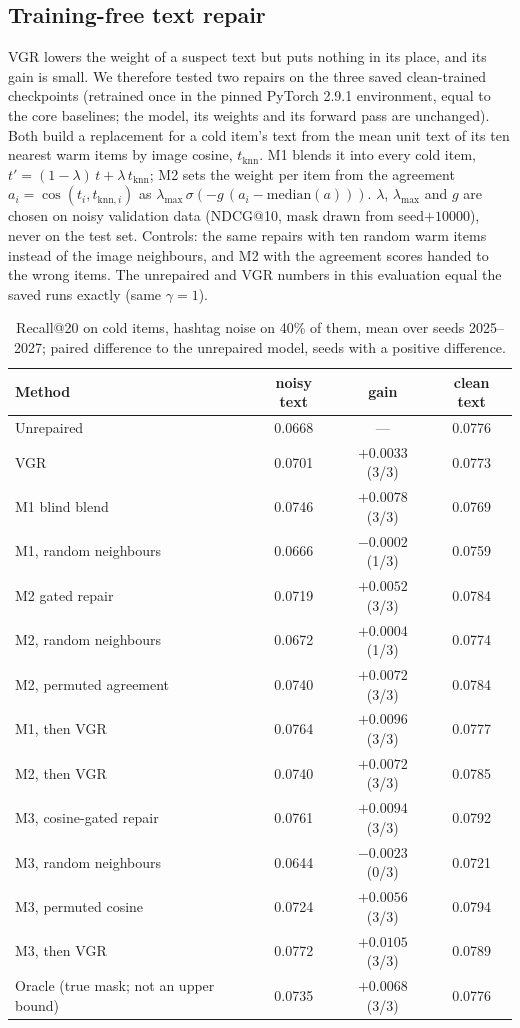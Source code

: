\documentclass[conference]{IEEEtran}
\begin{document}
\subsection{Training-free text repair}
\label{sec:repair}
VGR lowers the weight of a suspect text but puts nothing in its place, and its gain is small. We therefore tested two repairs on the three saved clean-trained checkpoints (retrained once in the pinned PyTorch 2.9.1 environment, equal to the core baselines; the model, its weights and its forward pass are unchanged). Both build a replacement for a cold item's text from the mean unit text of its ten nearest warm items by image cosine, $t_{\mathrm{knn}}$. M1 blends it into every cold item, $t' = (1-\lambda)\,t + \lambda\, t_{\mathrm{knn}}$; M2 sets the weight per item from the agreement $a_i = \cos(t_i, t_{\mathrm{knn},i})$ as $\lambda_{\max}\,\sigma(-g\,(a_i - \mathrm{median}(a)))$. $\lambda$, $\lambda_{\max}$ and $g$ are chosen on noisy validation data (NDCG@10, mask drawn from seed$+10000$), never on the test set. Controls: the same repairs with ten random warm items instead of the image neighbours, and M2 with the agreement scores handed to the wrong items. The unrepaired and VGR numbers in this evaluation equal the saved runs exactly (same $\gamma = 1$).

\begin{table}[t]
\centering\caption{Recall@20 on cold items, hashtag noise on 40\% of them, mean over seeds 2025--2027; paired difference to the unrepaired model, seeds with a positive difference.}
\label{tab:repair}
\small\setlength{\tabcolsep}{3pt}
\begin{tabular}{@{}>{\raggedright\arraybackslash}p{3.3cm}ccc@{}}
\hline
Method & noisy text & gain & clean text \\
\hline
Unrepaired & 0.0668 & --- & 0.0776 \\
VGR & 0.0701 & $+0.0033$ (3/3) & 0.0773 \\
M1 blind blend & 0.0746 & $+0.0078$ (3/3) & 0.0769 \\
M1, random neighbours & 0.0666 & $-0.0002$ (1/3) & 0.0759 \\
M2 gated repair & 0.0719 & $+0.0052$ (3/3) & 0.0784 \\
M2, random neighbours & 0.0672 & $+0.0004$ (1/3) & 0.0774 \\
M2, permuted agreement & 0.0740 & $+0.0072$ (3/3) & 0.0784 \\
M1, then VGR & 0.0764 & $+0.0096$ (3/3) & 0.0777 \\
M2, then VGR & 0.0740 & $+0.0072$ (3/3) & 0.0785 \\
M3, cosine-gated repair & 0.0761 & $+0.0094$ (3/3) & 0.0792 \\
M3, random neighbours & 0.0644 & $-0.0023$ (0/3) & 0.0721 \\
M3, permuted cosine & 0.0724 & $+0.0056$ (3/3) & 0.0794 \\
M3, then VGR & 0.0772 & $+0.0105$ (3/3) & 0.0789 \\
Oracle (true mask; not an upper bound) & 0.0735 & $+0.0068$ (3/3) & 0.0776 \\
\hline
\end{tabular}
\end{table}
\end{document}
